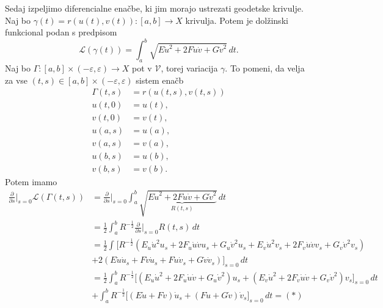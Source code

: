 Sedaj izpeljimo diferencialne enačbe, ki jim morajo ustrezati geodetske krivulje. Naj bo $\gamma(t) = r(u(t), v(t)): [a,b] \to X$ krivulja. Potem je dolžinski funkcional podan s predpisom \begin{equation*}
\mathcal{L}(\gamma(t)) = \int_{a}^{b} \sqrt{E\dot{u}^2 + 2F\dot{u}\dot{v} + G\dot{v}^2}  \, dt. 
\end{equation*}  
Naj bo $\Gamma : [a,b] \times  (-\varepsilon, \varepsilon) \to  X$ pot v $\mathcal{V}$, torej variacija $\gamma$. To pomeni, da velja za vse $(t,s) \in [a,b] \times  (-\varepsilon, \varepsilon)$ sistem enačb
\begin{align*}
    \Gamma(t,s) &= r(u(t,s), v(t,s)) \\
     u(t,0) &= u(t), \\
     v(t,0) &= v(t), \\
     u(a,s) &= u(a), \\
     v(a,s) &= v(a), \\
     u(b,s) &= u(b), \\
     v(b,s) &= v(b). 
\end{align*}
Potem imamo \begin{align*}
    \frac{ \partial  }{ \partial s} \bigg|_{s = 0} \mathcal{L}(\Gamma(t,s))  &= \frac{ \partial  }{ \partial s } \bigg|_{s = 0}  \int_{a}^{b} \sqrt{\underbrace{E\dot{u}^2 + 2F\dot{u}\dot{v} + G\dot{v}^2}_{R(t,s)}}  \, dt  \\
    &=  \frac{1}{2} \int_{a}^{b} R^{-\frac{1}{2}} \frac{ \partial  }{ \partial s } \bigg|_{s = 0} R(t,s)  \, dt \\
    &=  \frac{1}{2} \int_{} \bigg[R^{-\frac{1}{2}} (E_u \dot{u}^2 u_s + 2F_u \dot{u} \dot{v} u_s + G_u \dot{v}^2 u_s + E_v \dot{u}^2 v_s + 2F_v \dot{u} \dot{v} v_s + G_v \dot{v}^2 v_s) \\
    &+  2(E \dot{u} \dot{u}_s + F \dot{v} \dot{u}_s + F\dot{u} \dot{v}_s + G \dot{v} \dot{v}_s) \bigg]_{s = 0} \, dt \\
    &= \frac{1}{2} \int_{a}^{b}  R^{-\frac{1}{2}} \bigg[ (E_u \dot{u}^2 + 2F_u \dot{u} \dot{v} + G_u \dot{v}^2) u_s + (E_v \dot{u}^2 + 2F_v \dot{u} \dot{v} + G_v \dot{v}^2)v_s \bigg]_{s = 0} \, dt \\
    &+ \int_{a}^{b} R^{-\frac{1}{2}} \bigg[(E\dot{u} + F\dot{v})\dot{u}_s + (F\dot{u} + G\dot{v}) \dot{v}_s \bigg]_{s = 0} \, dt = (*)
\end{align*}  

